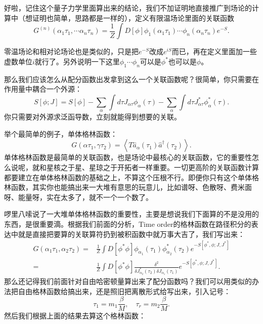 \documentclass[12pt, a4paper, oneside]{ctexart}
\begin{document}
好啦，记住这个量子力学里面算出来的结论，我们不加证明地直接推广到场论的计算中（想证明也简单，思路都是一样的），定义有限温场论里面的关联函数
\begin{equation}
    G^{(n)}(\alpha_1\tau_1,\cdots \alpha_n\tau_n)=\frac{1}{Z}\int D[\phi]\phi_1(\alpha_1\tau_1)\cdots\phi_n(\alpha_n\tau_n)e^{-S}.
\end{equation}

零温场论和相对论场论也是类似的，只是把$e^{-S}$改成$e^{iS}$而已，再在定义里面加一些虚数单位$i$就行了。另外说明一下这里$\phi_1\cdots\phi_n$可以是$\phi^*$也可以是$\phi$。

那么我们应该怎么从配分函数出发拿到这么一个关联函数呢？很简单，你只需要在作用量中耦合一个外源：
\begin{equation}
    S[\phi;J]=S[\phi]-\sum_\alpha\int d\tau J_{\alpha\tau}\phi_{\alpha}(\tau)-\sum_\alpha\int d\tau J^*_{\alpha\tau}\phi^*_{\alpha}(\tau).
\end{equation}
你只需要对外源求泛函导数，立刻就能得到想要的关联。

举个最简单的例子，单体格林函数：
\begin{equation}
    G(\alpha\tau_1,\gamma\tau_2)=\left< T\hat a_\alpha(\tau_1)\hat a^\dagger(\tau_2) \right>.
\end{equation}
单体格林函数是最简单的关联函数，也是场论中最核心的关联函数，它的重要性怎么说呢，就和星核之于星、星琼之于开拓者一样重要。一切更高阶的关联函数计算都要建立在单体格林函数的基础之上，不算这个压根不行。即便你只有这个单体格林函数，其实你也能搞出来一大堆有意思的玩意儿，比如谱呀、色散呀、费米面呀、能量呀，实在太多了，就不一个一个数了。

啰里八嗦说了一大堆单体格林函数的重要性，主要是想说我们下面算的不是没用的东西，是很重要滴。根据我们前面的分析，Time order的格林函数在路径积分的表达中就是直接把要算的关联算符扔到被积函数中就万事大吉了，我们写出来：
\begin{align}
    G(\alpha_1\tau_1,\alpha_2\tau_2)=&\frac{1}{Z}\int D[\phi^*\phi]\phi_{\alpha_1}(\tau_1) \phi^*_{\alpha_2} (\tau_2)e^{-S[\phi^*,\phi;J,J^*]}\nonumber\\ 
    =&\frac{1}{Z}\int D[\phi^*\phi]\frac{\delta^2}{\delta J^*_{\alpha_2}(\tau_2)\delta J_{\alpha_1}(\tau_1)}e^{-S[\phi^*,\phi;J,J^*]}.
\end{align}
那么还记得我们前面针对自由哈密顿量算出来了配分函数吗？我们可以用类似的办法把自由格林函数给搞出来，还是照旧把离散形式给写出来，引入记号：
\begin{equation}
    \tau_{1} = m_1\frac{\beta}{M} , \quad \tau_{r} = m_2 \frac{\beta}{M}.
\end{equation}
然后我们根据上面的结果去算这个格林函数：
\end{document}
